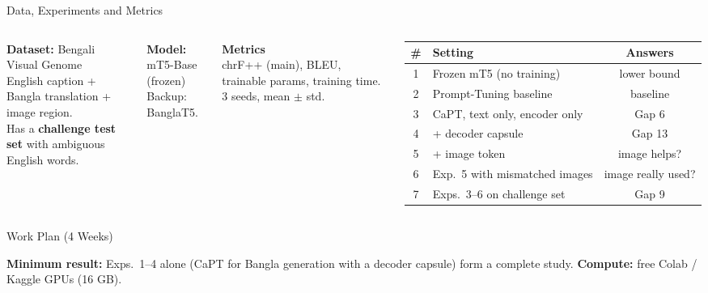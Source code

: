 \documentclass[aspectratio=169,11pt]{beamer}
\begin{document}
\begin{frame}{Data, Experiments and Metrics}
\begin{columns}[T]
\textbf{Dataset:} Bengali Visual Genome\\
\footnotesize English caption + Bangla translation + image region.\\
Has a \textbf{challenge test set} with ambiguous English words.

\vspace{8pt}
\normalsize\textbf{Model:} mT5-Base (frozen)\\
\footnotesize Backup: BanglaT5.

\vspace{8pt}
\normalsize\textbf{Metrics}\\
\footnotesize chrF++ (main), BLEU, trainable params, training time. 3 seeds, mean $\pm$ std.
\centering\footnotesize
\renewcommand{\arraystretch}{1.15}
\begin{tabular}{@{}clc@{}}
\toprule
\textbf{\#} & \textbf{Setting} & \textbf{Answers} \\
\midrule
1 & Frozen mT5 (no training) & lower bound \\
2 & Prompt-Tuning baseline & baseline \\
3 & CaPT, text only, encoder only & Gap 6 \\
4 & + decoder capsule & Gap 13 \\
5 & + image token & image helps? \\
6 & Exp.\ 5 with mismatched images & image really used? \\
7 & Exps.\ 3--6 on challenge set & Gap 9 \\
\bottomrule
\end{tabular}
\end{columns}
\end{frame}

\begin{frame}{Work Plan (4 Weeks)}
\centering
{}

\vspace{6pt}
\small \textbf{Minimum result:} Exps.\ 1--4 alone (CaPT for Bangla generation with a decoder capsule) form a complete study.
\quad \textbf{Compute:} free Colab / Kaggle GPUs (16 GB).
\end{frame}
\end{document}
